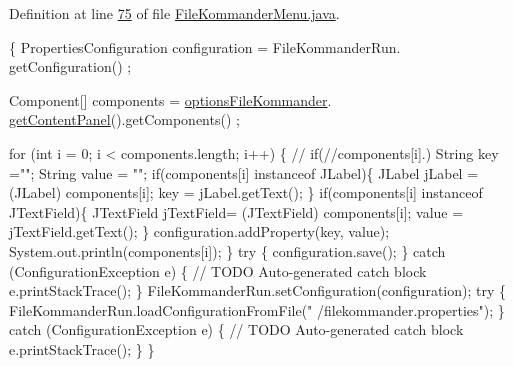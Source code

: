 Definition at line \hyperlink{L75}{75} of file \hyperlink{}{File\-Kommander\-Menu.\-java}.


\begin{DoxyCode}
                                    \{
        PropertiesConfiguration configuration = FileKommanderRun.
      getConfiguration() ;
        
        Component[] components = \hyperlink{classcom_1_1poly_1_1nlp_1_1filekommander_1_1views_1_1_file_kommander_menu_a003b2d89fc465db1befab3410121166d}{optionsFileKommander}.
      \hyperlink{classcom_1_1poly_1_1nlp_1_1filekommander_1_1views_1_1_options_file_kommander_a9620544d34bd81849c5883f30a84bab8}{getContentPanel}().getComponents() ;
        
        \textcolor{keywordflow}{for} (\textcolor{keywordtype}{int} i = 0; i < components.length; i++) \{
        \textcolor{comment}{//  if(//components[i].)}
            String key =\textcolor{stringliteral}{""};
            String value = \textcolor{stringliteral}{""};
            \textcolor{keywordflow}{if}(components[i] instanceof JLabel)\{
                JLabel jLabel = (JLabel) components[i];
                key = jLabel.getText();
            \}
            \textcolor{keywordflow}{if}(components[i] instanceof JTextField)\{
                JTextField jTextField= (JTextField) components[i];
                value = jTextField.getText();
            \}
            configuration.addProperty(key, value);
            System.out.println(components[i]);
        \}
        \textcolor{keywordflow}{try} \{
            configuration.save();
        \} \textcolor{keywordflow}{catch} (ConfigurationException e) \{
            \textcolor{comment}{// TODO Auto-generated catch block}
            e.printStackTrace();
        \}
        FileKommanderRun.setConfiguration(configuration);
        \textcolor{keywordflow}{try} \{
            FileKommanderRun.loadConfigurationFromFile(\textcolor{stringliteral}{"
      /filekommander.properties"});
        \} \textcolor{keywordflow}{catch} (ConfigurationException e) \{
            \textcolor{comment}{// TODO Auto-generated catch block}
            e.printStackTrace();
        \}
    \}
\end{DoxyCode}
